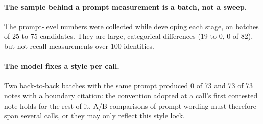 \paragraph{The sample behind a prompt measurement is a batch, not a sweep.} The
prompt-level numbers were collected while developing each stage, on batches of 25
to 75 candidates. They are large, categorical differences (19 to 0, 0 of 82), but
not recall measurements over 100 identities.

\paragraph{The model fixes a style per call.} Two back-to-back batches with the
same prompt produced 0 of 73 and 73 of 73 notes with a boundary citation: the
convention adopted at a call's first contested note holds for the rest of it. A/B
comparisons of prompt wording must therefore span several calls, or they may only
reflect this style lock.

